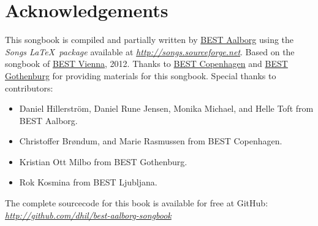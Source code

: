 \onecolumn
\thispagestyle{empty}
\section*{Acknowledgements}
This songbook is compiled and partially written by \href{http://best.aau.dk}{BEST Aalborg} using the \emph{Songs \LaTeX\ package} available at \href{http://songs.sourceforge.net}{\textit{http://songs.sourceforge.net}}.
Based on the songbook of \href{http://www.bestvienna.at}{BEST Vienna}, 2012. 
Thanks to \href{http://best.dtu.dk}{BEST Copenhagen} and \href{http://best.chs.chalmers.se/}{BEST Gothenburg} for providing materials for this songbook.
Special thanks to contributors:
\begin{itemize}
        \item Daniel Hillerström, Daniel Rune Jensen, Monika Michael, and Helle Toft from BEST Aalborg.
        \item Christoffer Brøndum, and Marie Rasmussen from BEST Copenhagen.
        \item Kristian Ott Milbo from BEST Gothenburg.
        \item Rok Kosmina from BEST Ljubljana.
\end{itemize}
The complete sourcecode for this book is available for free at GitHub: \href{http://github.com/dhil/best-aalborg-songbook}{\textit{http://github.com/dhil/best-aalborg-songbook}} 
\clearpage
\flushbottom
